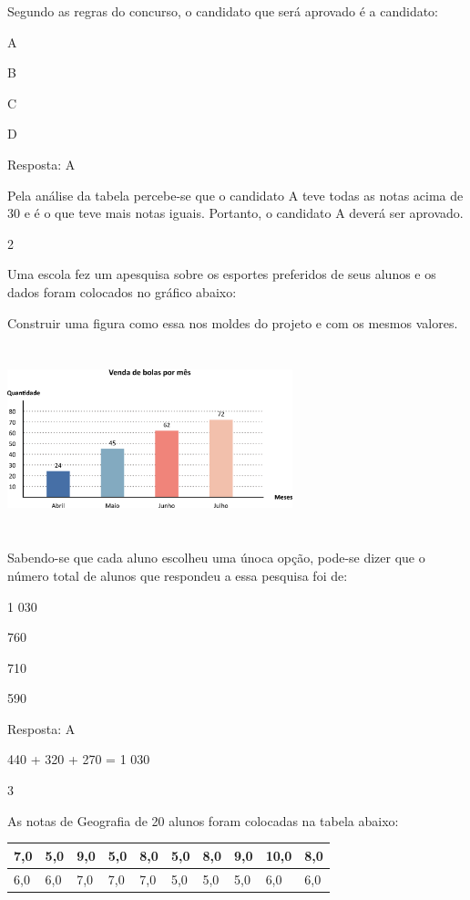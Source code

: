 \begin{escolha}
Segundo as regras do concurso, o candidato que será aprovado é a
candidato:

\begin{escolha}
\item
  A
\item
  B
\item
  C
\item
  D
\end{escolha}

Resposta: A

Pela análise da tabela percebe-se que o candidato A teve todas as notas
acima de 30 e é o que teve mais notas iguais. Portanto, o candidato A
deverá ser aprovado.

\num{2}

Uma escola fez um apesquisa sobre os esportes preferidos de seus alunos
e os dados foram colocados no gráfico abaixo:

Construir uma figura como essa nos moldes do projeto e com os mesmos
valores.

\includegraphics[width=3.25862in,height=2.14185in]{media/image105.png}

Sabendo-se que cada aluno escolheu uma únoca opção, pode-se dizer que o
número total de alunos que respondeu a essa pesquisa foi de:

\begin{escolha}
\item
  1 030
\item
  760
\item
  710
\item
  590
\end{escolha}

Resposta: A

440 + 320 + 270 = 1 030

\num{3}

As notas de Geografia de 20 alunos foram colocadas na tabela abaixo:

\begin{longtable}[]{@{}llllllllll@{}}
\toprule
7,0 & 5,0 & 9,0 & 5,0 & 8,0 & 5,0 & 8,0 & 9,0 & 10,0 &
8,0\tabularnewline
\midrule
\endhead
6,0 & 6,0 & 7,0 & 7,0 & 7,0 & 5,0 & 5,0 & 5,0 & 6,0 & 6,0\tabularnewline
\bottomrule
\end{longtable}


\end{escolha}

